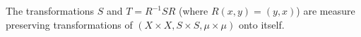 The transformations $S$ and $T = R^{-1}SR$ (where $R(x,y) = (y,x)$) are measure preserving transformations of $(X \times X, S \times S, \mu \times \mu)$ onto itself.
